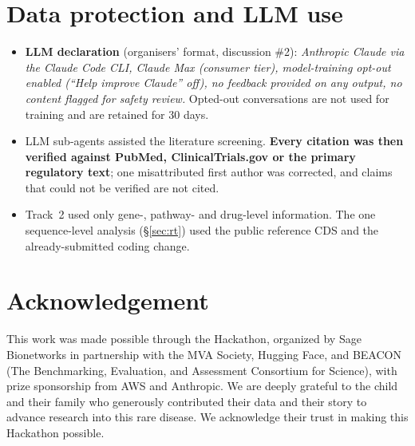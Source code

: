 \documentclass[10pt]{article}
\begin{document}
\section{Data protection and LLM use}
\begin{itemize}
\item \textbf{LLM declaration} (organisers' format, discussion \#2): \textit{Anthropic Claude via the Claude Code CLI,
  Claude Max (consumer tier), model-training opt-out enabled (``Help improve Claude'' off), no feedback provided on any
  output, no content flagged for safety review.} Opted-out conversations are not used for training and are retained
  for 30 days.
\item LLM sub-agents assisted the literature screening. \textbf{Every citation was then verified against PubMed,
  ClinicalTrials.gov or the primary regulatory text}; one misattributed first author was corrected, and claims that
  could not be verified are not cited.
\item Track~2 used only gene-, pathway- and drug-level information. The one sequence-level analysis (§\ref{sec:rt})
  used the public reference CDS and the already-submitted coding change.
\end{itemize}

\section*{Acknowledgement}
This work was made possible through the Hackathon, organized by Sage Bionetworks in partnership with the MVA Society,
Hugging Face, and BEACON (The Benchmarking, Evaluation, and Assessment Consortium for Science), with prize sponsorship
from AWS and Anthropic. We are deeply grateful to the child and their family who generously contributed their data
and their story to advance research into this rare disease. We acknowledge their trust in making this Hackathon
possible.
\end{document}
